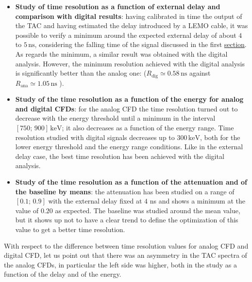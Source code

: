 \documentclass[a4paper]{article}
\begin{document}
\begin{itemize}
    \item [-] \textbf{Study of time resolution as a function of external delay and comparison with digital results}: 
    having calibrated in time the output of the TAC and having estimated the delay introduced by a LEMO cable, 
    it was possible to verify a minimum around the expected external delay of about $4$ to $5\,\mathrm{ns}$, considering the falling time of the signal discussed in the first \hyperlink{2.1}{section}. As regards the minimum, a similar result was obtained with the digital analysis. However, the minimum resolution achieved with the digital analysis is significantly better than the analog one: ($R_{\mathrm{dig}}\simeq0.58\,\mathrm{ns}$ against $R_{\mathrm{ana}}\simeq1.05\,\mathrm{ns}$ ).
    
     \item [-]  \textbf{Study of the time resolution as a function of the energy for analog and digital CFDs}: 
     for the analog CFD the time resolution turned out to decrease with the energy threshold until a minimum in
     the interval $\left[750;\,900\right]\, \mathrm{keV}$; 
    it also decreases as a function of the energy range.
    Time resolution studied with digital signals decreases up to $300\,\mathrm{keV}$, both for the lower energy threshold and the energy range conditions. Like in the external delay case, the best time resolution has been achieved with the digital analysis. 

    \item [-] \textbf{Study of the time resolution as a function of the attenuation and of the baseline by means}: the attenuation has been studied on a range of $\left[0.1;\,0.9\right]$ with the external delay fixed at $4$ ns and shows a minimum at the value of $0.20$ as expected. The baseline was studied around the mean value, but it shows up not to have a clear trend to define the optimization of this value to get a better time resolution.

\end{itemize}

\noindent With respect to the difference between time resolution values for analog CFD and digital CFD, let us point out that there was an asymmetry in the TAC spectra of the analog CFDs, in particular the left side was higher, both in the study as a function of the delay and of the energy. 
\end{document}
